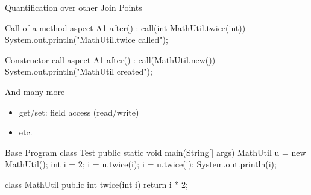 \begin{frame}[fragile]{Quantification over other Join Points}
	\begin{mycolumns}[widths={50,50},animation=none]
\begin{codetight}{Call of a method}
aspect A1 {
	after() : call(int MathUtil.twice(int)) {
		System.out.println("MathUtil.twice called");
	}
}
\end{codetight}
\begin{codetight}{Constructor call}
aspect A1 {
	after() : call(MathUtil.new()) {
		System.out.println("MathUtil created");
	}
}
\end{codetight}
		\begin{note}{And many more}
			\begin{itemize}
				\item get/set: field access (read/write)
				\item etc.
			\end{itemize}
		\end{note}
	\mynextcolumn
\begin{codetight}{Base Program}
class Test {
	public static void main(String[] args) {
		MathUtil u = new MathUtil();
		int i = 2;
		i = u.twice(i);
		i = u.twice(i);
		System.out.println(i);
	}
}

class MathUtil {
	public int twice(int i) {
		return i * 2;
	}
}
\end{codetight}	
	\end{mycolumns}
\end{frame}

